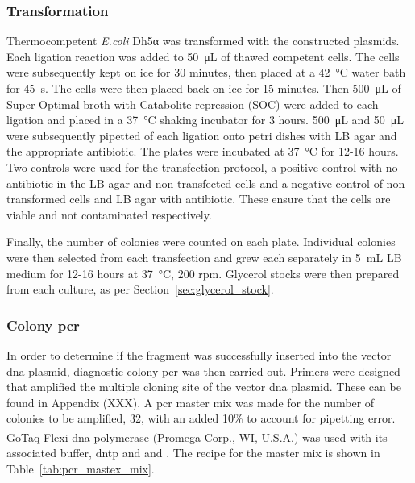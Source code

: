 \subsubsection{Transformation}
\label{sec:transfection}
Thermocompetent \textit{E.coli} Dh5α was transformed with the constructed plasmids. Each ligation reaction was added to \SI{50}{\micro\liter} of thawed competent cells. The cells were subsequently kept on ice for 30 minutes, then placed at a \SI{42}{\celsius} water bath for \SI{45}{\second}. The cells were then placed back on ice for 15 minutes. Then \SI{500}{\micro\liter} of Super Optimal broth with Catabolite repression (SOC) were added to each ligation and placed in a \SI{37}{\celsius} shaking incubator for 3 hours. \SI{500}{\micro\liter} and \SI{50}{\micro\liter} were subsequently pipetted of each ligation onto petri dishes with LB agar and the appropriate antibiotic. The plates were incubated at \SI{37}{\celsius} for 12-16 hours. Two controls were used for the transfection protocol, a positive control with no antibiotic in the LB agar and non-transfected cells and a negative control of non-transformed cells and LB agar with antibiotic. These ensure that the cells are viable and not contaminated respectively. 

Finally, the number of colonies were counted on each plate. Individual colonies were then selected from each transfection and grew each separately in \SI{5}{\milli\liter} LB medium for 12-16 hours at \SI{37}{\celsius}, 200 rpm. Glycerol stocks were then prepared from each culture, as per Section~\ref{sec:glycerol_stock}.



\subsubsection{Colony \acrshort{pcr}}

In order to determine if the fragment was successfully inserted into the vector \acrshort{dna} plasmid, diagnostic colony \acrshort{pcr} was then carried out. Primers were designed that amplified the multiple cloning site of the vector \acrshort{dna} plasmid. These can be found in Appendix (XXX). A \acrshort{pcr} master mix was made for the number of colonies to be amplified, 32, with an added 10\% to account for pipetting error. GoTaq\textsuperscript{\textregistered} Flexi \acrshort{dna} polymerase (Promega Corp., WI, U.S.A.) was used with its associated buffer, \acrshort{dntp} and and . The recipe for the master mix is shown in Table~\ref{tab:pcr_mastex_mix}.

